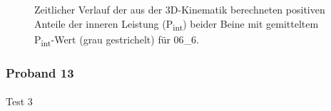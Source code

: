 \documentclass[
  letterpaper,
  DIV=11]{scrartcl}
\makeatletter
\let\oldparagraph\paragraph
\renewcommand{\paragraph}{
    \@ifstar
      \xxxParagraphStar
      \xxxParagraphNoStar
  }
\newcommand{\xxxParagraphStar}[1]{\oldparagraph*{#1}\mbox{}}
\newcommand{\xxxParagraphNoStar}[1]{\oldparagraph{#1}\mbox{}}
\makeatother
\begin{document}
\begin{figure}


\caption{\label{fig-PInt_Kinematik_06_6}Zeitlicher Verlauf der aus der
3D-Kinematik berechneten positiven Anteile der inneren Leistung
(P\textsubscript{int}) beider Beine mit gemitteltem
P\textsubscript{int}-Wert (grau gestrichelt) für 06\_6.}

\end{figure}%

\subsubsection{Proband 13}

\paragraph{Test 3}
\end{document}
